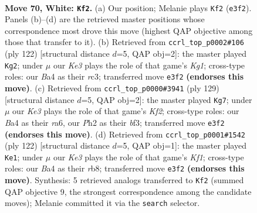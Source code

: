 \documentclass[11pt]{article}
\begin{document}
\clearpage

\begin{figure}[p]\centering
\begin{subfigure}{0.46\textwidth}\centering
\resizebox{\linewidth}{!}{%
\newchessgame
\chessboard[
  setfen={8/5R2/1k6/5P2/B7/4K3/7P/8 w - - 1 70},
  showmover=false,
  pgfstyle=straightmove, color=movearrow, markmove={e3-f2}
]}
\caption{}
\end{subfigure}\hfill
\begin{subfigure}{0.46\textwidth}\centering
\resizebox{\linewidth}{!}{%
\newchessgame
\chessboard[
  setfen={8/6k1/R7/7p/P6P/2r5/8/6K1 w - - 2 62},
  showmover=false,
  pgfstyle=straightmove, color=movearrow, markmove={g1-g2}
]}
\caption{}
\end{subfigure}
\\[4pt]
\begin{subfigure}{0.46\textwidth}\centering
\resizebox{\linewidth}{!}{%
\newchessgame
\chessboard[
  setfen={8/5k2/R7/8/7p/5B2/7r/5K2 b - - 3 65},
  showmover=false,
  pgfstyle=straightmove, color=movearrow, markmove={f7-g7}
]}
\caption{}
\end{subfigure}\hfill
\begin{subfigure}{0.46\textwidth}\centering
\resizebox{\linewidth}{!}{%
\newchessgame
\chessboard[
  setfen={1r6/7R/8/5p2/7P/5k2/8/5K2 w - - 0 62},
  showmover=false,
  pgfstyle=straightmove, color=movearrow, markmove={f1-e1}
]}
\caption{}
\end{subfigure}
\caption{\textbf{Move 70, White: \texttt{Kf2}.} (a) Our position; Melanie plays \texttt{Kf2} (\texttt{e3f2}). Panels (b)--(d) are the retrieved master positions whose correspondence most drove this move (highest QAP objective among those that transfer to it). (b) Retrieved from \texttt{ccrl\_top\_p0002\#106} (ply 122) [structural distance $d$=5, QAP obj=2]: the master played \texttt{Kg2}; under $\mu$ our \emph{Ke3} plays the role of that game's \emph{Kg1}; cross-type roles: our \emph{B}a4 as their \emph{r}c3; transferred move \texttt{e3f2} \textbf{(endorses this move)}. (c) Retrieved from \texttt{ccrl\_top\_p0000\#3941} (ply 129) [structural distance $d$=5, QAP obj=2]: the master played \texttt{Kg7}; under $\mu$ our \emph{Ke3} plays the role of that game's \emph{Kf2}; cross-type roles: our \emph{B}a4 as their \emph{r}a6, our \emph{P}h2 as their \emph{b}f3; transferred move \texttt{e3f2} \textbf{(endorses this move)}. (d) Retrieved from \texttt{ccrl\_top\_p0001\#1542} (ply 122) [structural distance $d$=5, QAP obj=1]: the master played \texttt{Ke1}; under $\mu$ our \emph{Ke3} plays the role of that game's \emph{Kf1}; cross-type roles: our \emph{B}a4 as their \emph{r}b8; transferred move \texttt{e3f2} \textbf{(endorses this move)}. Synthesis: 5 retrieved analogs transferred to \texttt{Kf2} (summed QAP objective 9, the strongest correspondence among the candidate moves); Melanie committed it via the \texttt{search} selector.}
\label{fig:thought-m138}
\end{figure}
\end{document}
